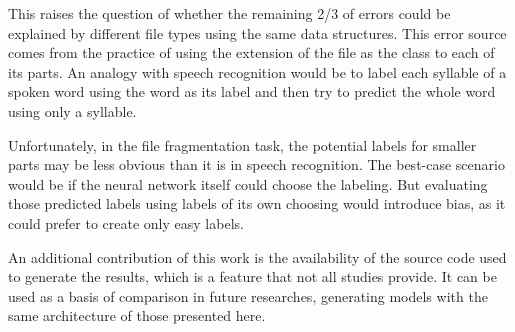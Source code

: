 This raises the question of whether the remaining 2/3 of errors could be explained by different file types using the same data structures. This error source comes from the practice of using the extension of the file as the class to each of its parts. An analogy with speech recognition would be to label each syllable of a spoken word using the word as its label and then try to predict the whole word using only a syllable.

Unfortunately, in the file fragmentation task, the potential labels for smaller parts may be less obvious than it is in speech recognition. The best-case scenario would be if the neural network itself could choose the labeling. But evaluating those predicted labels using labels of its own choosing would introduce bias, as it could prefer to create only easy labels.

An additional contribution of this work is the availability of the source code used to generate the results, which is a feature that not all studies provide. It can be used as a basis of comparison in future researches, generating models with the same architecture of those presented here.